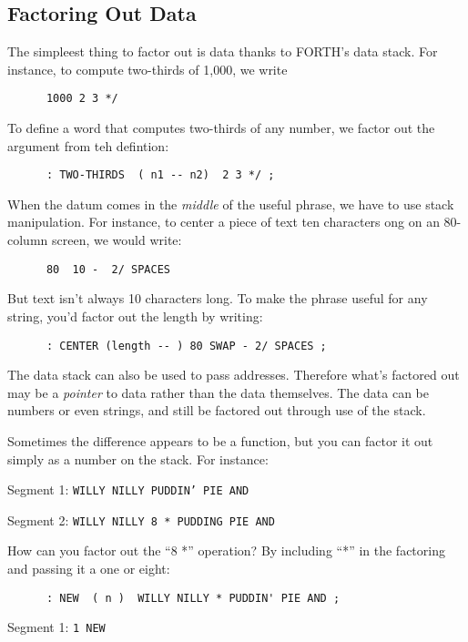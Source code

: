 \subsection{{Factoring Out Data}}
The simpleest thing to factor out is data thanks to FORTH's data stack. For instance, to compute two-thirds of 1,000, we write

\begin{verbatim}
      1000 2 3 */
\end{verbatim}
To define a word that computes two-thirds of any number, we factor out the argument from teh defintion:

\begin{verbatim}
      : TWO-THIRDS  ( n1 -- n2)  2 3 */ ;
\end{verbatim}
When the datum comes in the \emph{middle} of the useful phrase, we have to use stack manipulation. For instance, to center a piece of text ten characters ong on an 80-column screen, we would write:

\begin{verbatim}
      80  10 -  2/ SPACES
\end{verbatim}
But text isn't always 10 characters long. To make the phrase useful for any string, you'd factor out the length by writing:

\begin{verbatim}
      : CENTER (length -- ) 80 SWAP - 2/ SPACES ;
\end{verbatim}
The data stack can also be used to pass addresses. Therefore what's factored out may be a \emph{pointer} to data rather than the data themselves. The data can be numbers or even strings, and still be factored out through use of the stack.
	
Sometimes the difference appears to be a function, but you can factor it out simply as a number on the stack. For instance:

\bigskip

Segment 1:	\texttt{WILLY NILLY  PUDDIN' PIE AND}

Segment 2:	\texttt{WILLY NILLY  8 * PUDDING PIE AND}

\bigskip

\noindent
How can you factor out the ``8 *'' operation? By including ``*'' in the factoring and passing it a one or eight:

\begin{verbatim}
      : NEW  ( n )  WILLY NILLY * PUDDIN' PIE AND ;
\end{verbatim}

Segment 1:    \texttt{1 NEW}

